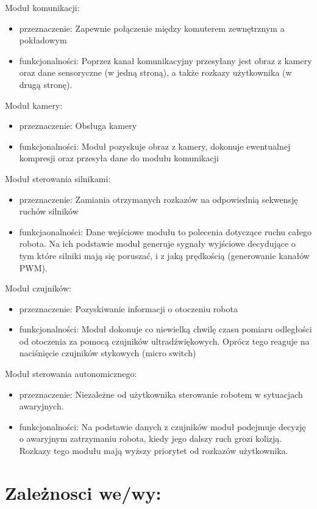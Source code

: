 \documentclass[a4paper]{article}
\begin{document}
Moduł komunikacji:
\begin{itemize}
\item przeznaczenie: Zapewnie połączenie między komuterem zewnętrznym a pokładowym
\item funkcjonalności: Poprzez kanał komunikacyjny przesyłany jest obraz z kamery oraz dane sensoryczne (w jedną stroną), a także rozkazy użytkownika (w drugą stronę). 
\end{itemize}

Moduł kamery:
\begin{itemize}
\item przeznaczenie: Obsługa kamery
\item funkcjonalności: Moduł pozyskuje obraz z kamery, dokonuje ewentualnej kompresji oraz przesyła dane do modułu komunikacji
\end{itemize}

Moduł sterowania silnikami:
\begin{itemize}
\item przeznaczenie: Zamiania otrzymanych rozkazów na odpowiednią sekwensję ruchów silników
\item funkcjaonalności: Dane wejściowe modułu to polecenia dotyczące ruchu całego robota. Na ich podstawie moduł generuje sygnały wyjściowe decydujące o tym które silniki mają się poruszać, i z jaką prędkością (generowanie kanałów PWM). 
\end{itemize}

Moduł czujników:
\begin{itemize}
\item przeznaczenie: Pozyskiwanie informacji o otoczeniu robota
\item funkcjonalności: Moduł dokonuje co niewielką chwilę czasu pomiaru odległości od otoczenia za pomocą czujników ultradźwiękowych. Oprócz tego reaguje na naciśnięcie czujników stykowych (micro switch)
\end{itemize}

Moduł sterowania autonomicznego:
\begin{itemize}
\item przeznaczenie: Niezależne od użytkownika sterowanie robotem w sytuacjach awaryjnych. 
\item funkcjonalności: Na podstawie danych z czujników moduł podejmuje decyzję o awaryjnym zatrzymaniu robota, kiedy jego dalszy ruch grozi kolizją. Rozkazy tego modułu mają wyższy priorytet od rozkazów użytkownika. 
\end{itemize}

\section{ Zależnosci we/wy:} %
\end{document}

